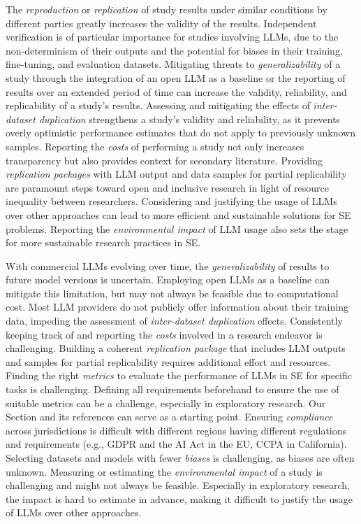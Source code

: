 
The \emph{reproduction} or \emph{replication} of study results under similar conditions by different parties greatly increases the validity of the results. %
Independent verification is of particular importance for studies involving LLMs, due to the non-determinism of their outputs and the potential for biases in their training, fine-tuning, and evaluation datasets.
Mitigating threats to \emph{generalizability} of a study through the integration of an open LLM as a baseline or the reporting of results over an extended period of time can increase the validity, reliability, and replicability of a study's results.
Assessing and mitigating the effects of \emph{inter-dataset duplication} strengthens a study's validity and reliability, as it prevents overly optimistic performance estimates that do not apply to previously unknown samples.
Reporting the \emph{costs} of performing a study not only increases transparency but also provides context for secondary literature. %
Providing \emph{replication packages} with LLM output and data samples for partial replicability are paramount steps toward open and inclusive research in light of resource inequality between researchers.
Considering and justifying the usage of LLMs over other approaches can lead to more efficient and sustainable solutions for SE problems. 
Reporting the \emph{environmental impact} of LLM usage also sets the stage for more sustainable research practices in SE.


With commercial LLMs evolving over time, the \emph{generalizability} of results to future model versions is uncertain.
Employing open LLMs as a baseline can mitigate this limitation, but may not always be feasible due to computational cost.
Most LLM providers do not publicly offer information about their training data, impeding the assessment of \emph{inter-dataset duplication} effects.
Consistently keeping track of and reporting the \emph{costs} involved in a research endeavor is challenging.
Building a coherent \emph{replication package} that includes LLM outputs and samples for partial replicability requires additional effort and resources.
Finding the right \emph{metrics} to evaluate the performance of LLMs in SE for specific tasks is challenging.
Defining all requirements beforehand to ensure the use of suitable metrics can be a challenge, especially in exploratory research.
Our Section \benchmarksmetrics and its references can serve as a starting point.
Ensuring \emph{compliance} across jurisdictions is difficult with different regions having different regulations and requirements (e.g., GDPR and the AI Act in the EU, CCPA in California).
Selecting datasets and models with fewer \emph{biases} is challenging, as biases are often unknown.
Measuring or estimating the \emph{environmental impact} of a study is challenging and might not always be feasible.
Especially in exploratory research, the impact is hard to estimate in advance, making it difficult to justify the usage of LLMs over other approaches.

